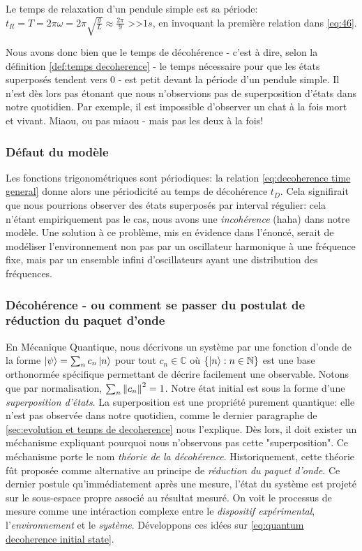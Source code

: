 \documentclass[11pt,oneside,a4paper]{article}
\begin{document}
Le temps de relaxation d'un pendule simple est sa période: $t_R=T=2\pi\omega=2\pi\sqrt{\frac{g}{L}}\approx \frac{2\pi}{9}$ >>$1s$, en invoquant la première relation dans \eqref{eq:46}.

Nous avons donc bien que le temps de décohérence - c'est à dire, selon la définition \ref{def:temps decoherence} - le temps nécessaire pour que les états superposés tendent vers 0 - est petit devant la période d'un pendule simple. Il n'est dès lors pas étonant que nous n'observions pas de superposition d'états dans notre quotidien. Par exemple, il est impossible d'observer un chat à la fois mort et vivant. Miaou, ou pas miaou - mais pas les deux à la fois! 


\subsubsection{Défaut du modèle}

Les fonctions trigonométriques sont périodiques: la relation \eqref{eq:decoherence time general} donne alors une périodicité au temps de décohérence $t_D$. Cela signifirait que nous pourrions observer des états superposés par interval régulier: cela n'étant empiriquement pas le cas, nous avons une \emph{incohérence} (haha) dans notre modèle. Une solution à ce problème, mis en évidence dans l'énoncé, serait de modéliser l'environnement non pas par un oscillateur harmonique à une fréquence fixe, mais par un ensemble infini d'oscillateurs ayant une distribution des fréquences.

\subsubsection{Décohérence - ou comment se passer du postulat de réduction du paquet d'onde}

En Mécanique Quantique, nous décrivons un système par une fonction d'onde de la forme $\ket{\psi} = \sum_n c_n\ket{n}$ pour tout $c_n\in\mathbb{C}$ où $\left\{\ket{n} : n\in\mathbb{N}\right\}$ est une base orthonormée spécifique permettant de décrire facilement une observable. Notons que par normalisation, $\sum_n \norm{c_n}^2 = 1$. Notre état initial est sous la forme d'une \emph{superposition d'états}. La superposition est une propriété purement quantique: elle n'est pas observée dans notre quotidien, comme le dernier paragraphe de \ref{sec:evolution et temps de decoherence} nous l'explique. Dès lors, il doit exister un méchanisme expliquant pourquoi nous n'observons pas cette "superposition". Ce méchanisme porte le nom \emph{théorie de la décohérence}. Historiquement, cette théorie fût proposée comme alternative au principe de \emph{réduction du paquet d'onde}. Ce dernier postule qu'immédiatement après une mesure, l'état du système est projeté sur le sous-espace propre associé au résultat mesuré. On voit le processus de mesure comme une intéraction complexe entre le \emph{dispositif expérimental}, l'\emph{environnement} et le \emph{système}. Développons ces idées sur \eqref{eq:quantum decoherence initial state}.\\
\end{document}
